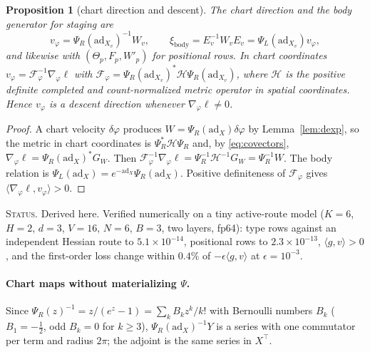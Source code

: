 \documentclass[11pt]{article}
\newtheorem{proposition}[theorem]{Proposition}
\theoremstyle{definition}
\theoremstyle{remark}
\newcommand{\ad}{\mathrm{ad}}
\newcommand{\ip}[2]{\langle #1, #2\rangle}
\newcommand{\status}[1]{\par\smallskip\noindent\textsc{Status.} #1\par\smallskip}
\begin{document}
\begin{proposition}[chart direction and descent]\label{prop:descent}
The chart direction and the body generator for staging are
\begin{equation}\label{eq:chartdir}
v_\varphi=\Psi_R(\ad_{X_v})^{-1}W_v,\qquad \xi_{\mathrm{body}}=E_v^{-1}W_vE_v=\Psi_L(\ad_{X_v})v_\varphi,
\end{equation}
and likewise with $(\Theta_p,F_p,W'_p)$ for positional rows. In chart coordinates $v_\varphi=\mathcal{F}_\varphi^{-1}\nabla_\varphi\ell$ with $\mathcal{F}_\varphi=\Psi_R(\ad_{X_v})^*\mathcal{H}\Psi_R(\ad_{X_v})$, where $\mathcal{H}$ is the positive definite completed and count-normalized metric operator in spatial coordinates. Hence $v_\varphi$ is a descent direction whenever $\nabla_\varphi\ell\neq0$.
\end{proposition}
\begin{proof}
A chart velocity $\delta\varphi$ produces $W=\Psi_R(\ad_X)\delta\varphi$ by Lemma~\ref{lem:dexp}, so the metric in chart coordinates is $\Psi_R^*\mathcal{H}\Psi_R$ and, by \eqref{eq:covectors}, $\nabla_\varphi\ell=\Psi_R(\ad_X)^*G_W$. Then $\mathcal{F}_\varphi^{-1}\nabla_\varphi\ell=\Psi_R^{-1}\mathcal{H}^{-1}G_W=\Psi_R^{-1}W$. The body relation is $\Psi_L(\ad_X)=e^{-\ad_X}\Psi_R(\ad_X)$. Positive definiteness of $\mathcal{F}_\varphi$ gives $\ip{\nabla_\varphi\ell}{v_\varphi}>0$.
\end{proof}
\status{Derived here. Verified numerically on a tiny active-route model ($K=6$, $H=2$, $d=3$, $V=16$, $N=6$, $B=3$, two layers, fp64): type rows against an independent Hessian route to $5.1\times10^{-14}$, positional rows to $2.3\times10^{-13}$, $\ip{g}{v}>0$, and the first-order loss change within $0.4\%$ of $-\epsilon\ip{g}{v}$ at $\epsilon=10^{-3}$.}

\paragraph{Chart maps without materializing $\Psi$.} Since $\Psi_R(z)^{-1}=z/(e^z-1)=\sum_kB_kz^k/k!$ with Bernoulli numbers $B_k$ ($B_1=-\frac12$, odd $B_k=0$ for $k\ge3$), $\Psi_R(\ad_X)^{-1}Y$ is a series with one commutator per term and radius $2\pi$; the adjoint is the same series in $X^\top$.
\end{document}
